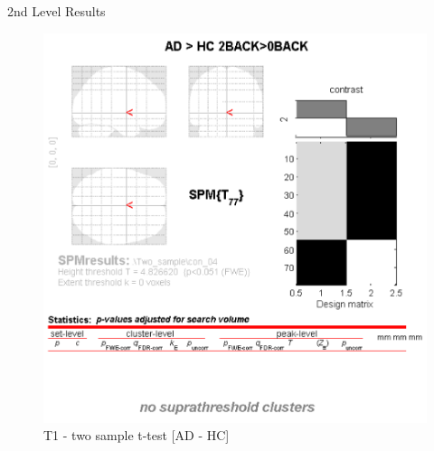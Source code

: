 \documentclass{bredelebeamer}
\begin{document}
\begin{frame}{2nd Level Results}
\begin{figure}
\centering
\includegraphics[scale=0.37]{images/SPM3.PNG}
\caption{\tiny{T1 - two sample t-test [AD - HC]}}
\end{figure}
\end{frame}
\end{document}
